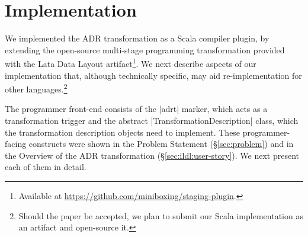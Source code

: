 \section{Implementation}
\label{sec:impl}

We implemented the ADR transformation as a Scala compiler plugin, by
extending the open-source multi-stage programming transformation
provided with the Lata Data Layout \cite{ldl}
artifact\footnote{Available at \url{https://github.com/miniboxing/staging-plugin}.}.
%
We next describe aspects of our implementation that, although
technically specific, may aid re-implementation for other
languages.\footnote{Should the paper be accepted, we plan to submit our Scala
implementation as an artifact and open-source it.}

The programmer front-end consists of the |adrt| marker, which acts as a transformation trigger and the abstract |TransformationDescription| class, which the transformation description objects need to implement. These programmer-facing constructs were shown in the Problem Statement (\S\ref{sec:problem}) and in the Overview of the ADR transformation (\S\ref{sec:ildl:user-story}). We next present each of them in detail.

